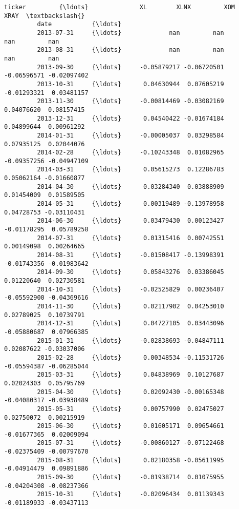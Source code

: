 \documentclass[11pt]{article}
\begin{document}
\begin{Verbatim}[commandchars=\\\{\}]
         ticker         {\ldots}              XL        XLNX         XOM        XRAY  \textbackslash{}
         date           {\ldots}                                                       
         2013-07-31     {\ldots}             nan         nan         nan         nan   
         2013-08-31     {\ldots}             nan         nan         nan         nan   
         2013-09-30     {\ldots}     -0.05879217 -0.06720501 -0.06596571 -0.02097402   
         2013-10-31     {\ldots}      0.04630944  0.07605219 -0.01293321  0.03481157   
         2013-11-30     {\ldots}     -0.00814469 -0.03082169  0.04076620  0.08157415   
         2013-12-31     {\ldots}      0.04540422 -0.01674184  0.04899644  0.00961292   
         2014-01-31     {\ldots}     -0.00005037  0.03298584  0.07935125  0.02044076   
         2014-02-28     {\ldots}     -0.10243348  0.01082965 -0.09357256 -0.04947109   
         2014-03-31     {\ldots}      0.05615273  0.12286783  0.05062164 -0.01660877   
         2014-04-30     {\ldots}      0.03284340  0.03888909  0.01454009  0.01589505   
         2014-05-31     {\ldots}      0.00319489 -0.13978958  0.04728753 -0.03110431   
         2014-06-30     {\ldots}      0.03479430  0.00123427 -0.01178295  0.05789258   
         2014-07-31     {\ldots}      0.01315416  0.00742551  0.00149098  0.00264665   
         2014-08-31     {\ldots}     -0.01508417 -0.13998391 -0.01743356 -0.01983642   
         2014-09-30     {\ldots}      0.05843276  0.03386045  0.01220640  0.02730581   
         2014-10-31     {\ldots}     -0.02525829  0.00236407 -0.05592900 -0.04369616   
         2014-11-30     {\ldots}      0.02117902  0.04253010  0.02789025  0.10739791   
         2014-12-31     {\ldots}      0.04727105  0.03443096 -0.05880687  0.07966385   
         2015-01-31     {\ldots}     -0.02838693 -0.04847111  0.02087622 -0.03037006   
         2015-02-28     {\ldots}      0.00348534 -0.11531726 -0.05594387 -0.06285044   
         2015-03-31     {\ldots}      0.04838969  0.10127687  0.02024303  0.05795769   
         2015-04-30     {\ldots}      0.02092430 -0.00165348 -0.04080317 -0.03938489   
         2015-05-31     {\ldots}      0.00757990  0.02475027  0.02750072  0.00215919   
         2015-06-30     {\ldots}      0.01605171  0.09654661 -0.01677365  0.02009094   
         2015-07-31     {\ldots}     -0.00860127 -0.07122468 -0.02375409 -0.00797670   
         2015-08-31     {\ldots}      0.02180358 -0.05611995 -0.04914479  0.09891886   
         2015-09-30     {\ldots}     -0.01938714  0.01075955 -0.04204308 -0.08237366   
         2015-10-31     {\ldots}     -0.02096434  0.01139343 -0.01189933 -0.03437113   

\end{Verbatim}
\end{document}
